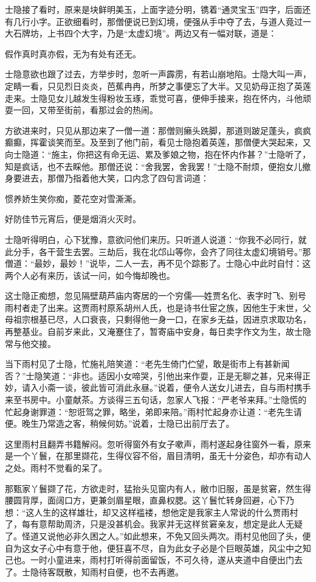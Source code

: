 士隐接了看时，原来是块鲜明美玉，上面字迹分明，镌着“通灵宝玉”四字，后面还有几行小字。正欲细看时，那僧便说已到幻境，便强从手中夺了去，与道人竟过一大石牌坊，上书四个大字，乃是“太虚幻境”。两边又有一幅对联，道是：

假作真时真亦假，无为有处有还无。

士隐意欲也跟了过去，方举步时，忽听一声霹雳，有若山崩地陷。士隐大叫一声，定睛一看，只见烈日炎炎，芭蕉冉冉，所梦之事便忘了大半。又见奶母正抱了英莲走来。士隐见女儿越发生得粉妆玉琢，乖觉可喜，便伸手接来，抱在怀内，斗他顽耍一回，又带至街前，看那过会的热闹。

方欲进来时，只见从那边来了一僧一道：那僧则癞头跣脚，那道则跛足蓬头，疯疯癫癫，挥霍谈笑而至。及至到了他门前，看见士隐抱着英莲，那僧便大哭起来，又向士隐道：“施主，你把这有命无运、累及爹娘之物，抱在怀内作甚？”士隐听了，知是疯话，也不去睬他。那僧还说：“舍我罢，舍我罢！”士隐不耐烦，便抱女儿撤身要进去，那僧乃指着他大笑，口内念了四句言词道：

惯养娇生笑你痴，菱花空对雪澌澌。

好防佳节元宵后，便是烟消火灭时。

士隐听得明白，心下犹豫，意欲问他们来历。只听道人说道：“你我不必同行，就此分手，各干营生去罢。三劫后，我在北邙山等你，会齐了同往太虚幻境销号。”那僧道：“最妙，最妙！”说毕，二人一去，再不见个踪影了。士隐心中此时自忖：这两个人必有来历，该试一问，如今悔却晚也。

这士隐正痴想，忽见隔壁葫芦庙内寄居的一个穷儒──姓贾名化、表字时飞、别号雨村者走了出来。这贾雨村原系胡州人氏，也是诗书仕宦之族，因他生于末世，父母祖宗根基已尽，人口衰丧，只剩得他一身一口，在家乡无益，因进京求取功名，再整基业。自前岁来此，又淹蹇住了，暂寄庙中安身，每日卖字作文为生，故士隐常与他交接。

当下雨村见了士隐，忙施礼陪笑道：“老先生倚门伫望，敢是街市上有甚新闻否？”士隐笑道：“非也。适因小女啼哭，引他出来作耍，正是无聊之甚，兄来得正妙，请入小斋一谈，彼此皆可消此永昼。”说着，便令人送女儿进去，自与雨村携手来至书房中。小童献茶。方谈得三五句话，忽家人飞报：“严老爷来拜。”士隐慌的忙起身谢罪道：“恕诳驾之罪，略坐，弟即来陪。”雨村忙起身亦让道：“老先生请便。晚生乃常造之客，稍候何妨。”说着，士隐已出前厅去了。

这里雨村且翻弄书籍解闷。忽听得窗外有女子嗽声，雨村遂起身往窗外一看，原来是一个丫鬟，在那里撷花，生得仪容不俗，眉目清明，虽无十分姿色，却亦有动人之处。雨村不觉看的呆了。

那甄家丫鬟撷了花，方欲走时，猛抬头见窗内有人，敝巾旧服，虽是贫窘，然生得腰圆背厚，面阔口方，更兼剑眉星眼，直鼻权腮。这丫鬟忙转身回避，心下乃想：“这人生的这样雄壮，却又这样褴褛，想他定是我家主人常说的什么贾雨村了，每有意帮助周济，只是没甚机会。我家并无这样贫窘亲友，想定是此人无疑了。怪道又说他必非久困之人。”如此想来，不免又回头两次。雨村见他回了头，便自为这女子心中有意于他，便狂喜不尽，自为此女子必是个巨眼英雄，风尘中之知己也。一时小童进来，雨村打听得前面留饭，不可久待，遂从夹道中自便出门去了。士隐待客既散，知雨村自便，也不去再邀。

